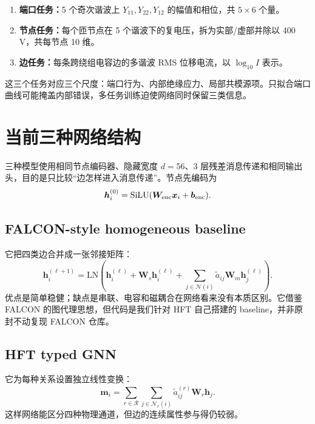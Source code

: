 \documentclass[UTF8,11pt,a4paper]{ctexart}
\newcommand{\mat}[1]{\bm{#1}}
\begin{document}
\begin{enumerate}
\item \textbf{端口任务：}5 个奇次谐波上 $Y_{11},Y_{22},Y_{12}$ 的幅值和相位，共 $5\times6$ 个量。
\item \textbf{节点任务：}每个匝节点在 5 个谐波下的复电压，拆为实部/虚部并除以 400 V，共每节点 10 维。
\item \textbf{边任务：}每条跨绕组电容边的多谐波 RMS 位移电流，以 $\log_{10}I$ 表示。
\end{enumerate}

这三个任务对应三个尺度：端口行为、内部绝缘应力、局部共模源项。只拟合端口曲线可能掩盖内部错误，多任务训练迫使网络同时保留三类信息。

\section{当前三种网络结构}

三种模型使用相同节点编码器、隐藏宽度 $d=56$、3 层残差消息传递和相同输出头，目的是只比较“边怎样进入消息传递”。节点先编码为
\begin{equation}
 \mat h_i^{(0)}=\mathrm{SiLU}(\mat W_{\rm enc}\mat x_i+\mat b_{\rm enc}).
\end{equation}

\subsection{FALCON-style homogeneous baseline}

它把四类边合并成一张邻接矩阵：
\begin{equation}
 \mat h_i^{(\ell+1)}=\mathrm{LN}\!\left(\mat h_i^{(\ell)}+
 \mat W_s\mat h_i^{(\ell)}+
 \sum_{j\in\mathcal N(i)}\tilde a_{ij}\mat W_m\mat h_j^{(\ell)}\right).
\end{equation}
优点是简单稳健；缺点是串联、电容和磁耦合在网络看来没有本质区别。它借鉴 FALCON 的图代理思想，但代码是我们针对 HFT 自己搭建的 baseline，并非原封不动复现 FALCON 仓库。

\subsection{HFT typed GNN}

它为每种关系设置独立线性变换：
\begin{equation}
 \mat m_i=\sum_{r\in\mathcal R}\sum_{j\in\mathcal N_r(i)}
 \tilde a_{ij}^{(r)}\mat W_r\mat h_j.
\end{equation}
这样网络能区分四种物理通道，但边的连续属性参与得仍较弱。
\end{document}
